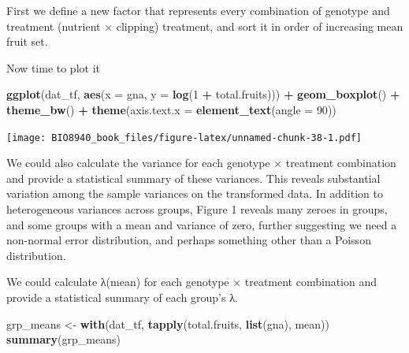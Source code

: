 \documentclass[
  12pt,
]{book}
\newenvironment{Shaded}{\begin{snugshade}}{\end{snugshade}}
\newcommand{\DataTypeTok}[1]{\textcolor[rgb]{0.13,0.29,0.53}{#1}}
\newcommand{\DecValTok}[1]{\textcolor[rgb]{0.00,0.00,0.81}{#1}}
\newcommand{\KeywordTok}[1]{\textcolor[rgb]{0.13,0.29,0.53}{\textbf{#1}}}
\newcommand{\NormalTok}[1]{#1}
\newcommand{\OperatorTok}[1]{\textcolor[rgb]{0.81,0.36,0.00}{\textbf{#1}}}
\newcommand{\StringTok}[1]{\textcolor[rgb]{0.31,0.60,0.02}{#1}}
\begin{document}
First we define a new factor that represents every combination of genotype and treatment (nutrient × clipping) treatment, and sort it in order of increasing mean fruit set.

\begin{Shaded}
\end{Shaded}

Now time to plot it

\begin{Shaded}
\begin{Highlighting}[]
\KeywordTok{ggplot}\NormalTok{(dat_tf, }\KeywordTok{aes}\NormalTok{(}\DataTypeTok{x =}\NormalTok{ gna, }\DataTypeTok{y =} \KeywordTok{log}\NormalTok{(}\DecValTok{1} \OperatorTok{+}\StringTok{ }\NormalTok{total.fruits))) }\OperatorTok{+}
\StringTok{  }\KeywordTok{geom_boxplot}\NormalTok{() }\OperatorTok{+}
\StringTok{  }\KeywordTok{theme_bw}\NormalTok{() }\OperatorTok{+}
\StringTok{  }\KeywordTok{theme}\NormalTok{(}\DataTypeTok{axis.text.x =} \KeywordTok{element_text}\NormalTok{(}\DataTypeTok{angle =} \DecValTok{90}\NormalTok{))}
\end{Highlighting}
\end{Shaded}

\texttt{[image: BIO8940\_book\_files/figure-latex/unnamed-chunk-38-1.pdf]}

We could also calculate the variance for each genotype × treatment combination and provide a statistical summary of these variances.
This reveals substantial variation among the sample variances on the transformed data. In addition to heterogeneous variances across groups, Figure 1 reveals many zeroes in groups, and some groups with a mean and variance of zero, further suggesting we need a non-normal error distribution, and perhaps something other than a Poisson distribution.

We could calculate λ(mean) for each genotype × treatment combination and provide a statistical summary of each group's λ.

\begin{Shaded}
\begin{Highlighting}[]
\NormalTok{grp_means <-}\StringTok{ }\KeywordTok{with}\NormalTok{(dat_tf, }\KeywordTok{tapply}\NormalTok{(total.fruits, }\KeywordTok{list}\NormalTok{(gna), mean))}
\KeywordTok{summary}\NormalTok{(grp_means)}
\end{Highlighting}
\end{Shaded}
\end{document}
